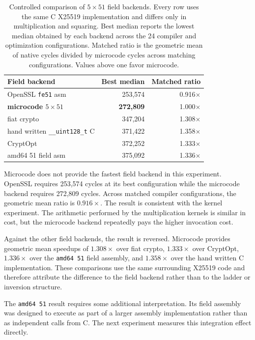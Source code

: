 \documentclass[journal=tches,submission]{iacrtrans}
\newcommand{\code}[1]{\texttt{#1}}
\begin{document}
\begin{table}[!ht]
\centering
\caption{Controlled comparison of $5\times51$ field backends.
Every row uses the same C X25519 implementation and differs only in multiplication and squaring.
Best median reports the lowest median obtained by each backend across the 24 compiler and optimization configurations.
Matched ratio is the geometric mean of native cycles divided by microcode cycles across matching configurations.
Values above one favor microcode.}
\label{tab}
\footnotesize
\setlength{\tabcolsep}{4pt}
\begin{tabular}{@{}lrr@{}}
\toprule
Field backend & Best median & Matched ratio \\
\midrule
OpenSSL \code{fe51} asm &
253,574 &
0.916$\times$ \\
\textbf{microcode $5\times51$} &
\textbf{272,809} &
1.000$\times$ \\
fiat crypto &
347,204 &
1.308$\times$ \\
hand written \code{\_\_uint128\_t} C &
371,422 &
1.358$\times$ \\
CryptOpt &
372,252 &
1.333$\times$ \\
amd64 51 field asm &
375,092 &
1.336$\times$ \\
\bottomrule
\end{tabular}
\end{table}

Microcode does not provide the fastest field backend in this experiment.
OpenSSL requires 253,574 cycles at its best configuration while the microcode backend requires 272,809 cycles.
Across matched compiler configurations, the geometric mean ratio is $0.916\times$.
The result is consistent with the kernel experiment.
The arithmetic performed by the multiplication kernels is similar in cost, but the microcode backend repeatedly pays the higher invocation cost.

Against the other field backends, the result is reversed.
Microcode provides geometric mean speedups of $1.308\times$ over fiat crypto, $1.333\times$ over CryptOpt, $1.336\times$ over the \texttt{amd64 51} field assembly, and $1.358\times$ over the hand written C implementation.
These comparisons use the same surrounding X25519 code and therefore attribute the difference to the field backend rather than to the ladder or inversion structure.

The \texttt{amd64 51} result requires some additional interpretation.
Its field assembly was designed to execute as part of a larger assembly implementation rather than as independent calls from C.
The next experiment measures this integration effect directly.
\end{document}
